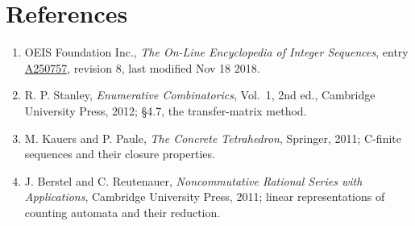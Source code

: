 \documentclass[11pt]{article}
\theoremstyle{definition}
\begin{document}
\section{References}

\begin{enumerate}

\item OEIS Foundation Inc., \emph{The On-Line Encyclopedia of Integer Sequences}, entry \href{https://oeis.org/A250757}{A250757}, revision 8, last modified Nov 18 2018.

\item R. P. Stanley, \emph{Enumerative Combinatorics}, Vol.~1, 2nd ed., Cambridge University Press, 2012; \S4.7, the transfer-matrix method.

\item M. Kauers and P. Paule, \emph{The Concrete Tetrahedron}, Springer, 2011; C-finite sequences and their closure properties.

\item J. Berstel and C. Reutenauer, \emph{Noncommutative Rational Series with Applications}, Cambridge University Press, 2011; linear representations of counting automata and their reduction.

\end{enumerate}
\end{document}
